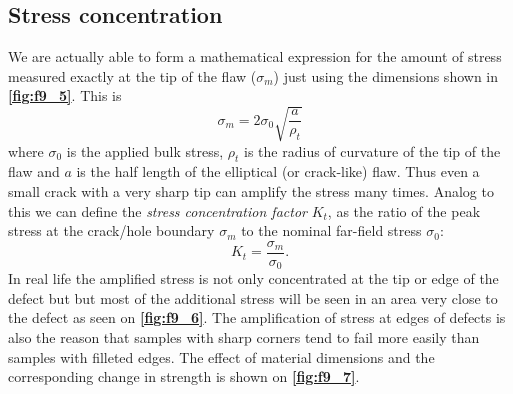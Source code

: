 \subsection{Stress concentration} \label{sec:strcon}
We are actually able to form a mathematical expression for the amount of stress measured exactly at the tip of the flaw ($\sigma_m$) just using the dimensions shown in \textbf{\autoref{fig:f9_5}}. This is
\[ 
\sigma_m = 2\sigma_0 \sqrt{\frac{a}{\rho_t}}
\]
where $\sigma_0$ is the applied bulk stress, $\rho_t$ is the radius of curvature of the tip of the flaw and $a$ is the half length of the elliptical (or crack-like) flaw. Thus even a small crack with a very sharp tip can amplify the stress many times. Analog to this we can define the \textit{stress concentration factor} $K_t$, as the ratio of the peak stress at the crack/hole boundary $\sigma_m$ to the nominal far-field stress $\sigma_0$:
\[ 
K_t = \frac{\sigma_m}{\sigma_0}
.\]
In real life the amplified stress is not only concentrated at the tip or edge of the defect but but most of the additional stress will be seen in an area very close to the defect as seen on \textbf{\autoref{fig:f9_6}}. The amplification of stress at edges of defects is also the reason that samples with sharp corners tend to fail more easily than samples with filleted edges. The effect of material dimensions and the corresponding change in strength is shown on \textbf{\autoref{fig:f9_7}}.

